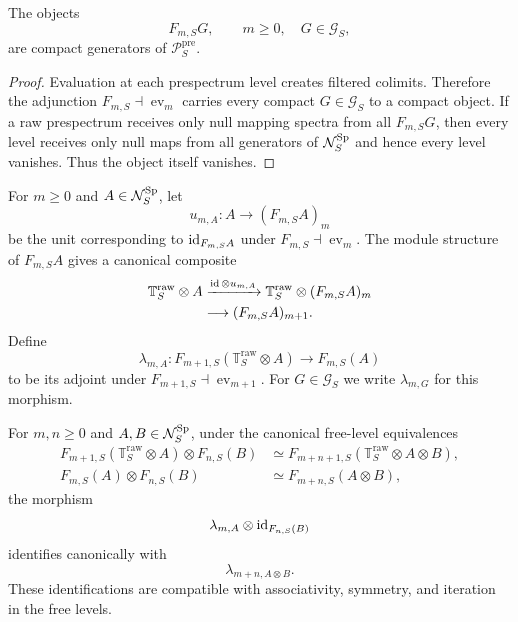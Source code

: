 \begin{proposition}
\label{prop:infinitesimal-raw-compact-generators}
The objects
\[
    F_{m,S}G,
    \qquad
    m\geq0,
    \quad
    G\in\mathcal G_S,
\]
are compact generators of $\mathcal P_S^{\mathrm{pre}}$.
\end{proposition}

\begin{proof}
Evaluation at each prespectrum level creates filtered colimits.  Therefore the
adjunction $F_{m,S}\dashv\operatorname{ev}_m$ carries every compact
$G\in\mathcal G_S$ to a compact object.  If a raw prespectrum receives only
null mapping spectra from all $F_{m,S}G$, then every level receives only null
maps from all generators of $\mathcal N_S^{\mathrm{Sp}}$ and hence every level vanishes.
Thus the object itself vanishes.
\end{proof}

\begin{definition}
\label{def:infinitesimal-raw-thom-stabilization}
For $m\geq0$ and $A\in\mathcal N_S^{\mathrm{Sp}}$, let
\[
    u_{m,A}:A\longrightarrow(F_{m,S}A)_m
\]
be the unit corresponding to $\operatorname{id}_{F_{m,S}A}$ under
$F_{m,S}\dashv\operatorname{ev}_m$.  The module structure of $F_{m,S}A$
gives a canonical composite
\[
\begin{aligned}
    \mathbb T_S^{\mathrm{raw}}\otimes A
    &\xrightarrow{\operatorname{id}\otimes u_{m,A}}
    \mathbb T_S^{\mathrm{raw}}\otimes(F_{m,S}A)_m\\
    &\longrightarrow
    (F_{m,S}A)_{m+1}.
\end{aligned}
\]
Define
\[
    \boxed{
    \lambda_{m,A}:
    F_{m+1,S}(\mathbb T_S^{\mathrm{raw}}\otimes A)
    \longrightarrow
    F_{m,S}(A)
    }
\]
to be its adjoint under
$F_{m+1,S}\dashv\operatorname{ev}_{m+1}$.  For
$G\in\mathcal G_S$ we write $\lambda_{m,G}$ for this morphism.
\end{definition}

\begin{lemma}
\label{lem:infinitesimal-raw-thom-stabilization-tensor}
For $m,n\geq0$ and $A,B\in\mathcal N_S^{\mathrm{Sp}}$, under the canonical free-level
equivalences
\[
\begin{aligned}
    F_{m+1,S}(\mathbb T_S^{\mathrm{raw}}\otimes A)
    \otimes F_{n,S}(B)
    &\simeq
    F_{m+n+1,S}(\mathbb T_S^{\mathrm{raw}}\otimes A\otimes B),\\
    F_{m,S}(A)\otimes F_{n,S}(B)
    &\simeq
    F_{m+n,S}(A\otimes B),
\end{aligned}
\]
the morphism
\[
    \lambda_{m,A}\otimes\operatorname{id}_{F_{n,S}(B)}
\]
identifies canonically with
\[
    \boxed{
    \lambda_{m+n,A\otimes B}.
    }
\]
These identifications are compatible with associativity, symmetry, and
iteration in the free levels.
\end{lemma}


